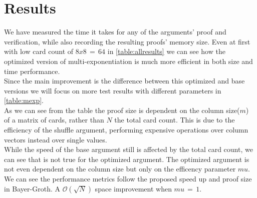 \documentclass[12pt,a4paper]{report}
\begin{document}
\chapter{Results}
We have measured the time it takes for any of the arguments' proof and verification, while also recording the resulting proofs' memory size. 
Even at first with low card count of $8 x 8\,=\,64$ in \ref{table:allresults} we can see how the optimized version of multi-exponentiation is much more efficient in both size and time performance.\\
Since the main improvement is the difference between this optimized and base versions we will focus on more test results with different parameters in \ref{table:mexp}.\\
As we can see from the table the proof size is dependent on the column size($m$) of a matrix of cards, rather than $N$ the total card count.
This is due to the efficiency of the shuffle argument, performing expensive operations over column vectors instead over single values.\\
While the speed of the base argument still is affected by the total card count, we can see that is not true for the optimized argument. The optimized argument is not even dependent on the column size but only on the efficency parameter $mu$.
We can see the performance metrics follow the proposed speed up and proof size in Bayer-Groth. A $\mathcal{O}(\sqrt{N})$\cite{bgshuffle} space improvement when $mu\,=\,1$.
\end{document}
